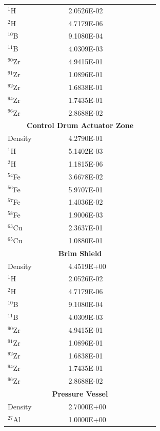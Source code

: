 \documentclass[8pt,a5paper]{article}
\begin{document}
\begin{longtable}{|m{0.3\linewidth}|m{0.45\linewidth}|}
    $^{1}$H & \SI{2.0526E-02}{} \\
    $^{2}$H & \SI{4.7179E-06}{} \\
    $^{10}$B & \SI{9.1080E-04}{} \\
    $^{11}$B & \SI{4.0309E-03}{} \\
    $^{90}$Zr & \SI{4.9415E-01}{} \\
    $^{91}$Zr & \SI{1.0896E-01}{} \\
    $^{92}$Zr & \SI{1.6838E-01}{} \\
    $^{94}$Zr & \SI{1.7435E-01}{} \\
    $^{96}$Zr & \SI{2.8688E-02}{} \\\hline
    \multicolumn{2}{|c|}{\textbf{Control Drum Actuator Zone}}\\\hline
    Density & \SI{4.2790E-01}{} \\
    $^{1}$H & \SI{5.1402E-03}{} \\
    $^{2}$H & \SI{1.1815E-06}{} \\
    $^{54}$Fe & \SI{3.6678E-02}{} \\
    $^{56}$Fe & \SI{5.9707E-01}{} \\
    $^{57}$Fe & \SI{1.4036E-02}{} \\
    $^{58}$Fe & \SI{1.9006E-03}{} \\
    $^{63}$Cu & \SI{2.3637E-01}{} \\
    $^{65}$Cu & \SI{1.0880E-01}{} \\\hline
    \multicolumn{2}{|c|}{\textbf{Brim Shield}}\\\hline
    Density & \SI{4.4519E+00}{} \\
    $^{1}$H & \SI{2.0526E-02}{} \\
    $^{2}$H & \SI{4.7179E-06}{} \\
    $^{10}$B & \SI{9.1080E-04}{} \\
    $^{11}$B & \SI{4.0309E-03}{} \\
    $^{90}$Zr & \SI{4.9415E-01}{} \\
    $^{91}$Zr & \SI{1.0896E-01}{} \\
    $^{92}$Zr & \SI{1.6838E-01}{} \\
    $^{94}$Zr & \SI{1.7435E-01}{} \\
    $^{96}$Zr & \SI{2.8688E-02}{} \\\hline
    \multicolumn{2}{|c|}{\textbf{Pressure Vessel}}\\\hline
    Density & \SI{2.7000E+00}{} \\
    $^{27}$Al & \SI{1.0000E+00}{} 
\end{longtable}
\end{document}
